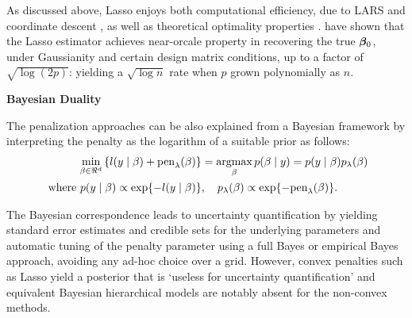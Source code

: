 \documentclass[chapters]{uamaththesis}
\begin{document}
As discussed above, Lasso enjoys both computational efficiency, due to LARS \citep{efron_least_2004} and coordinate descent \citep{friedman_pathwise_2007}, as well as theoretical optimality properties \citep{buhlmann2011statistics}. \citet{bickel2009simultaneous} have shown that the Lasso estimator achieves near-orcale property in recovering the true $\boldsymbol{\beta}_0$, under Gaussianity and certain design matrix conditions, up to a factor of $\sqrt{\log( 2 p)}$: yielding a $\sqrt{\log n}$ rate when $p$ grown polynomially as $n$. 

\noindent \textbf{Bayesian Duality}

The penalization approaches can be also explained from a Bayesian framework by interpreting the penalty as the logarithm of a suitable prior as follows:
\begin{align}
 \min_{\beta \in \Re^d}
  \left\{
    l(y \mid \beta) + \text{pen}_{\lambda}(\beta) 
  \right\}
  & = \argmax_\beta p(\beta \mid y) = p(y \mid \beta) p_{\lambda}(\beta) \nonumber \\
	\text{ where } p(y \mid \beta) \propto \exp\{-l(y \mid \beta)\} & , \quad p_{\lambda}(\beta)
  \propto \exp\{ -\text{pen}_{\lambda}(\beta) \}. \label{eq:pen} \nonumber
\end{align}

The Bayesian correspondence leads to uncertainty quantification by yielding standard error estimates and credible sets for the underlying parameters and automatic tuning of the penalty parameter using a full Bayes or empirical Bayes approach, avoiding any ad-hoc choice over a grid. However, convex penalties such as Lasso yield a posterior that is `useless for uncertainty quantification' \citep{castillo2015bayesian} and equivalent Bayesian hierarchical models are notably absent for the non-convex methods. 
\end{document}
